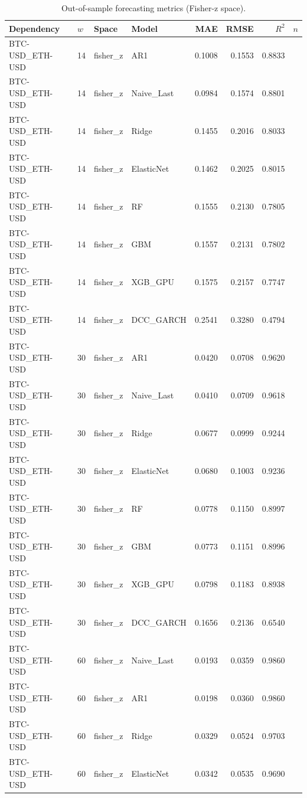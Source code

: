 \begin{table}[H]
\centering
\small
\caption{Out-of-sample forecasting metrics (Fisher-z space).}
\label{tab:model_comparison}
\begin{tabular}{llllrrrr}
\toprule
Dependency & $w$ & Space & Model & MAE & RMSE & $R^2$ & $n$ \\
\midrule
BTC-USD_ETH-USD & 14 & fisher_z & AR1 & 0.1008 & 0.1553 & 0.8833 &  \\
BTC-USD_ETH-USD & 14 & fisher_z & Naive_Last & 0.0984 & 0.1574 & 0.8801 &  \\
BTC-USD_ETH-USD & 14 & fisher_z & Ridge & 0.1455 & 0.2016 & 0.8033 &  \\
BTC-USD_ETH-USD & 14 & fisher_z & ElasticNet & 0.1462 & 0.2025 & 0.8015 &  \\
BTC-USD_ETH-USD & 14 & fisher_z & RF & 0.1555 & 0.2130 & 0.7805 &  \\
BTC-USD_ETH-USD & 14 & fisher_z & GBM & 0.1557 & 0.2131 & 0.7802 &  \\
BTC-USD_ETH-USD & 14 & fisher_z & XGB_GPU & 0.1575 & 0.2157 & 0.7747 &  \\
BTC-USD_ETH-USD & 14 & fisher_z & DCC_GARCH & 0.2541 & 0.3280 & 0.4794 &  \\
BTC-USD_ETH-USD & 30 & fisher_z & AR1 & 0.0420 & 0.0708 & 0.9620 &  \\
BTC-USD_ETH-USD & 30 & fisher_z & Naive_Last & 0.0410 & 0.0709 & 0.9618 &  \\
BTC-USD_ETH-USD & 30 & fisher_z & Ridge & 0.0677 & 0.0999 & 0.9244 &  \\
BTC-USD_ETH-USD & 30 & fisher_z & ElasticNet & 0.0680 & 0.1003 & 0.9236 &  \\
BTC-USD_ETH-USD & 30 & fisher_z & RF & 0.0778 & 0.1150 & 0.8997 &  \\
BTC-USD_ETH-USD & 30 & fisher_z & GBM & 0.0773 & 0.1151 & 0.8996 &  \\
BTC-USD_ETH-USD & 30 & fisher_z & XGB_GPU & 0.0798 & 0.1183 & 0.8938 &  \\
BTC-USD_ETH-USD & 30 & fisher_z & DCC_GARCH & 0.1656 & 0.2136 & 0.6540 &  \\
BTC-USD_ETH-USD & 60 & fisher_z & Naive_Last & 0.0193 & 0.0359 & 0.9860 &  \\
BTC-USD_ETH-USD & 60 & fisher_z & AR1 & 0.0198 & 0.0360 & 0.9860 &  \\
BTC-USD_ETH-USD & 60 & fisher_z & Ridge & 0.0329 & 0.0524 & 0.9703 &  \\
BTC-USD_ETH-USD & 60 & fisher_z & ElasticNet & 0.0342 & 0.0535 & 0.9690 &  \\

\end{tabular}
\end{table}
